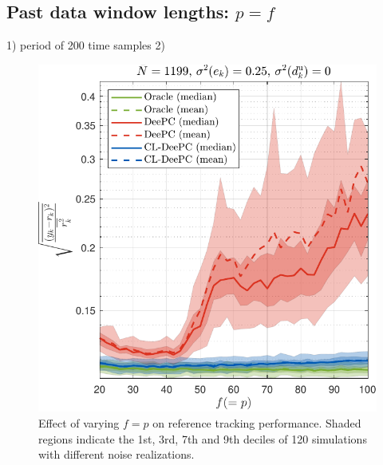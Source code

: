 \subsection{Past data window lengths: $p=f$}
1) period of 200 time samples
2) 
\begin{figure}[b!]
\begin{center}
\includegraphics[width=\columnwidth]{results/figures/Varying_pf_20-100-41_Nbar_1199_Re_0.25_Ru_1_Rdu_0_Q_100_R_0_dR_10.pdf}    %
\caption{Effect of varying $f=p$ on reference tracking performance. Shaded regions indicate the 1st, 3rd, 7th and 9th deciles of 120 simulations with different noise realizations.}  %
\label{fig:varying_Re}                                 %
\end{center}                                 %
\end{figure}
